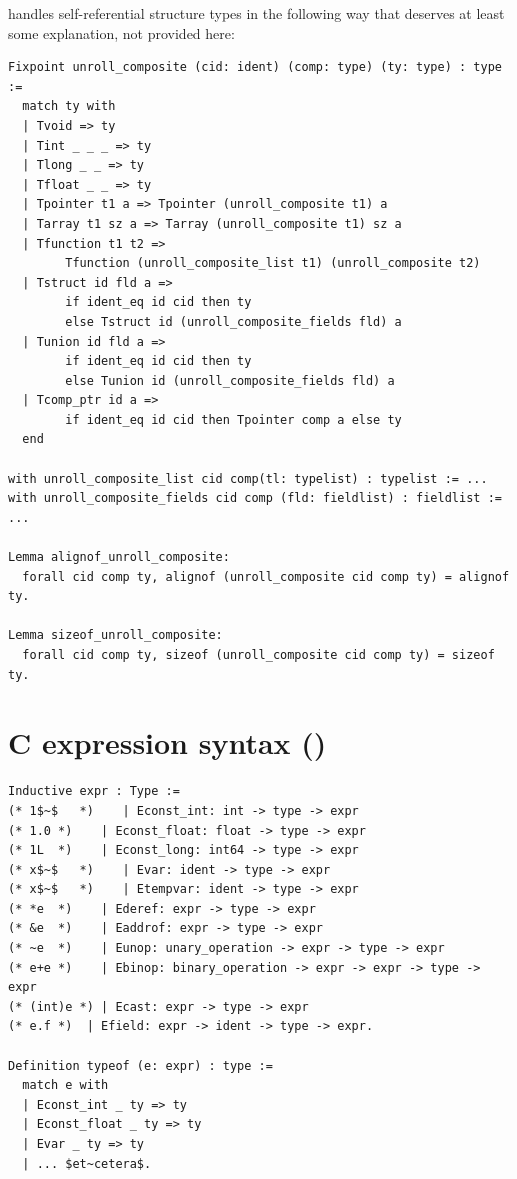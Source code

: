 \documentclass[12pt,fleqn,openany,oneside,showtrims]{memoir}
\newcommand{\ychapter}[2]{\chapter[#1]{#1 \hfill \normalsize #2}}
\begin{document}
\clearpage
{} handles self-referential structure types
in the following way that deserves at least some explanation,
not provided here:
\begin{lstlisting}
Fixpoint unroll_composite (cid: ident) (comp: type) (ty: type) : type :=
  match ty with
  | Tvoid => ty
  | Tint _ _ _ => ty
  | Tlong _ _ => ty
  | Tfloat _ _ => ty
  | Tpointer t1 a => Tpointer (unroll_composite t1) a
  | Tarray t1 sz a => Tarray (unroll_composite t1) sz a
  | Tfunction t1 t2 => 
        Tfunction (unroll_composite_list t1) (unroll_composite t2)
  | Tstruct id fld a => 
        if ident_eq id cid then ty 
        else Tstruct id (unroll_composite_fields fld) a
  | Tunion id fld a => 
        if ident_eq id cid then ty 
        else Tunion id (unroll_composite_fields fld) a
  | Tcomp_ptr id a => 
        if ident_eq id cid then Tpointer comp a else ty
  end

with unroll_composite_list cid comp(tl: typelist) : typelist := ...
with unroll_composite_fields cid comp (fld: fieldlist) : fieldlist := ...

Lemma alignof_unroll_composite:
  forall cid comp ty, alignof (unroll_composite cid comp ty) = alignof ty.

Lemma sizeof_unroll_composite:
  forall cid comp ty, sizeof (unroll_composite cid comp ty) = sizeof ty.
\end{lstlisting}
\ychapter{C expression syntax}{(\file{compcert/cfrontend/Clight.v})}

\begin{lstlisting}
Inductive expr : Type :=
(* 1$~$   *)    | Econst_int: int -> type -> expr      
(* 1.0 *)    | Econst_float: float -> type -> expr  
(* 1L  *)    | Econst_long: int64 -> type -> expr
(* x$~$   *)    | Evar: ident -> type -> expr         
(* x$~$   *)    | Etempvar: ident -> type -> expr     
(* *e  *)    | Ederef: expr -> type -> expr        
(* &e  *)    | Eaddrof: expr -> type -> expr       
(* ~e  *)    | Eunop: unary_operation -> expr -> type -> expr
(* e+e *)    | Ebinop: binary_operation -> expr -> expr -> type -> expr 
(* (int)e *) | Ecast: expr -> type -> expr  
(* e.f *)  | Efield: expr -> ident -> type -> expr. 

Definition typeof (e: expr) : type :=
  match e with
  | Econst_int _ ty => ty
  | Econst_float _ ty => ty
  | Evar _ ty => ty
  | ... $et~cetera$.
\end{lstlisting}
\end{document}
